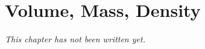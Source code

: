 \chapter{Volume, Mass, Density}\label{ch:g7:volume-mass-density}


\emph{This chapter has not been written yet.}
